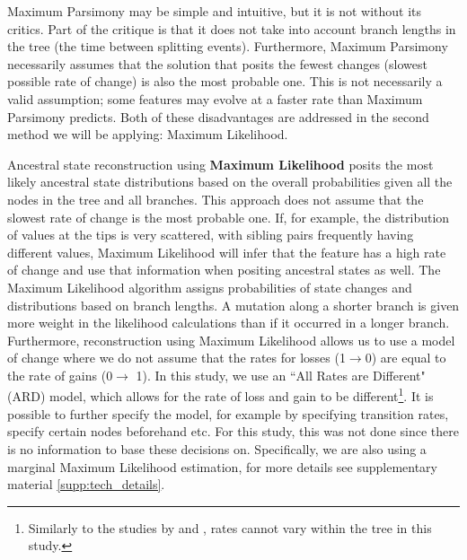 \documentclass[12pt,letterpaper]{article}
\begin{document}
Maximum Parsimony may be simple and intuitive, but it is not without its critics. Part of the critique is that it does not take into account branch lengths in the tree (the time between splitting events). Furthermore, Maximum Parsimony necessarily assumes that the solution that posits the fewest changes (slowest possible rate of change) is also the most probable one. This is not necessarily a valid assumption; some features may evolve at a faster rate than Maximum Parsimony predicts. Both of these disadvantages are addressed in the second method we will be applying: Maximum Likelihood.

Ancestral state reconstruction using \textbf{Maximum Likelihood} posits the most likely ancestral state distributions based on the overall probabilities given all the nodes in the tree and all branches. This approach does not assume that the slowest rate of change is the most probable one. If, for example, the distribution of values at the tips is very scattered, with sibling pairs frequently having different values, Maximum Likelihood will infer that the feature has a high rate of change and use that information when positing ancestral states as well. The Maximum Likelihood algorithm assigns probabilities of state changes and distributions based on branch lengths. A mutation along a shorter branch is given more weight in the likelihood calculations than if it occurred in a longer branch. Furthermore, reconstruction using Maximum Likelihood allows us to use a model of change where we do not assume that the rates for losses (1$\rightarrow$0) are equal to the rate of gains (0$\rightarrow$ 1). In this study, we use an ``All Rates are Different" (ARD) model, which allows for the rate of loss and gain to be different\footnote{Similarly to the studies by \citet{carling2021reconstructing} and \citet{goldstein_2022}, rates cannot vary within the tree in this study.}. It is possible to further specify the model, for example by specifying transition rates, specify certain nodes beforehand etc. For this study, this was not done since there is no information to base these decisions on. Specifically, we are also using a marginal Maximum Likelihood estimation, for more details see supplementary material \ref{supp:tech_details}.
\end{document}
